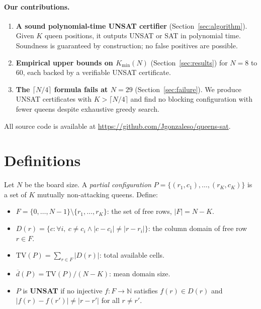 \documentclass[11pt]{article}
\begin{document}
\paragraph{Our contributions.}
\begin{enumerate}
\item \textbf{A sound polynomial-time UNSAT certifier} (Section~\ref{sec:algorithm}).
      Given $K$ queen positions, it outputs UNSAT or SAT in polynomial time.
      Soundness is guaranteed by construction; no false positives are possible.

\item \textbf{Empirical upper bounds on $K_{\min}(N)$} (Section~\ref{sec:results})
      for $N = 8$ to $60$, each backed by a verifiable UNSAT certificate.

\item \textbf{The $\lceil N/4 \rceil$ formula fails at $N = 29$}
      (Section~\ref{sec:failure}).
      We produce UNSAT certificates with $K > \lceil N/4 \rceil$ and
      find no blocking configuration with fewer queens despite exhaustive
      greedy search.
\end{enumerate}

All source code is available at
\url{https://github.com/Jgonzaleso/queens-sat}.

\section{Definitions}

Let $N$ be the board size. A \emph{partial configuration}
$P = \{(r_1,c_1),\ldots,(r_K,c_K)\}$ is a set of $K$ mutually non-attacking
queens.
Define:
\begin{itemize}
\item $F = \{0,\ldots,N-1\} \setminus \{r_1,\ldots,r_K\}$: the set of free rows,
      $|F| = N - K$.
\item $D(r) = \{c : \forall i,\ c \neq c_i \wedge |c - c_i| \neq |r - r_i|\}$:
      the column domain of free row $r \in F$.
\item $\text{TV}(P) = \sum_{r \in F} |D(r)|$: total available cells.
\item $\overline{d}(P) = \text{TV}(P)/(N-K)$: mean domain size.
\item $P$ is \textbf{UNSAT} if no injective $f: F \to \mathbb{N}$ satisfies
      $f(r) \in D(r)$ and $|f(r) - f(r')| \neq |r - r'|$ for all $r \neq r'$.
\end{itemize}
\end{document}

